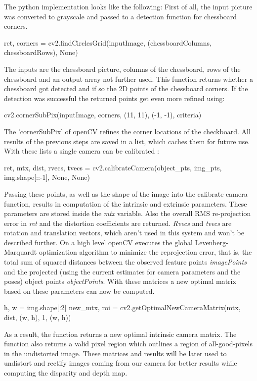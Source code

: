 \documentclass[journal,onecolumn]{IEEEtran}
\begin{document}
The python implementation looks like the following: \newline
First of all, the input picture was converted to grayscale and passed to a detection function for chessboard corners.
\begin{python}
ret, corners = cv2.findCirclesGrid(inputImage, (chessboardColumns, chessboardRows), None)
\end{python}
The inputs are the chessboard picture, columns of the chessboard, rows of the chessboard and an output array not further used.
This function returns whether a chessboard got detected and if so the 2D points of the chessboard corners. If the detection was successful the returned points get even more refined using:
\begin{python}
cv2.cornerSubPix(inputImage, corners, (11, 11), (-1, -1), criteria)
\end{python}
The 'cornerSubPix' of openCV refines the corner locations \cite{forstner} of the checkboard.
All results of the previous steps are saved in a list, which caches them for future use. With these lists a single camera can be calibrated :
\begin{python}
ret, mtx, dist, rvecs, tvecs = cv2.calibrateCamera(object_pts, img_pts, img.shape[::-1], None,
											None)
\end{python}
Passing these points, as well as the shape of the image into the calibrate camera function, results in computation of the intrinsic and extrinsic parameters.
These parameters are stored inside the \emph{mtx} variable. Also the overall RMS re-projection error\cite{hartley_zisserman_2004} in \emph{ret} and the distortion coefficients are returned. \emph{Rvecs}\cite{DBLP} and \emph{tvecs} are rotation and translation vectors, which aren't used in this system and won't be described further.
On a high level openCV executes the global Levenberg-Marquardt optimization algorithm to minimize the reprojection error, that is, the total sum of squared distances between the observed feature points \emph{imagePoints} and the projected (using the current estimates for camera parameters and the poses) object points \emph{objectPoints}\cite{calibrateCamera}.
With these matrices a new optimal matrix based on these parameters can now be computed.
\begin{python}
h, w = img.shape[:2]
new_mtx, roi = cv2.getOptimalNewCameraMatrix(mtx, dist, (w, h), 1, (w, h))
\end{python}
As a result, the function returns a new optimal intrinsic camera matrix. The function also returns a valid pixel region which outlines a region of all-good-pixels in the undistorted image. These matrices and results will be later used to undistort and rectify images coming from our camera for better results while computing the disparity and depth map.
\end{document}
